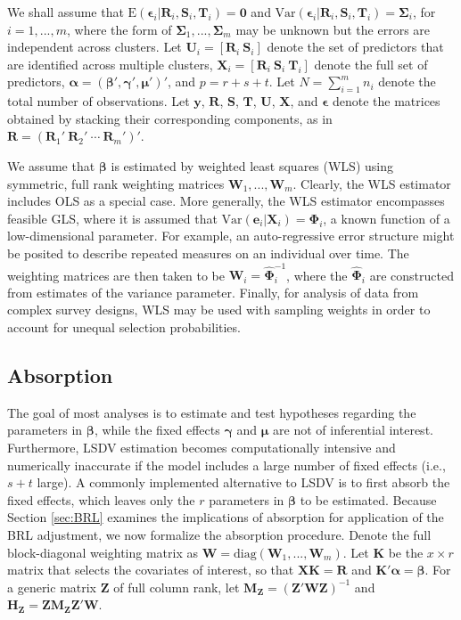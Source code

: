 \documentclass[12pt]{article}\usepackage[]{graphicx}\usepackage[]{color}
\newcommand{\E}{\text{E}}
\newcommand{\Var}{\text{Var}}
\newcommand{\bm}{\mathbf}
\newcommand{\bs}{\boldsymbol}
\begin{document}
We shall assume that $\E\left(\bs\epsilon_i\left|\bm{R}_i,\bm{S}_i, \bm{T}_i\right.\right) = \bm{0}$ and $\Var\left(\bs\epsilon_i\left|\bm{R}_i,\bm{S}_i,\bm{T}_i\right.\right) = \bs\Sigma_i$, for $i = 1,...,m$, where the form of $\bs\Sigma_1,...,\bs\Sigma_m$ may be unknown but the errors are independent across clusters. 
Let $\bm{U}_i = \left[\bm{R}_i \ \bm{S}_i \right]$ denote the set of predictors that are identified across multiple clusters, $\bm{X}_i = \left[\bm{R}_i \ \bm{S}_i \ \bm{T}_i \right]$ denote the full set of predictors, $\bs\alpha = \left(\bs\beta', \bs\gamma', \bs\mu' \right)'$, and $p = r + s + t$.
Let $N = \sum_{i=1}^m n_i$ denote the total number of observations.
Let $\bm{y}$, $\bm{R}$, $\bm{S}$, $\bm{T}$, $\bm{U}$, $\bm{X}$, and $\bs\epsilon$ denote the matrices obtained by stacking their corresponding components, as in $\bm{R} = \left(\bm{R}_1' \ \bm{R}_2' \ \cdots \ \bm{R}_m'\right)'$. 

We assume that $\bs\beta$ is estimated by weighted least squares (WLS) using symmetric, full rank weighting matrices $\bm{W}_1,...,\bm{W}_m$. 
Clearly, the WLS estimator includes OLS as a special case.
More generally, the WLS estimator encompasses feasible GLS, where it is assumed that $\Var\left(\bm{e}_i\left|\bm{X}_i\right.\right) = \bs\Phi_i$, a known function of a low-dimensional parameter. 
For example, an auto-regressive error structure might be posited to describe repeated measures on an individual over time. 
The weighting matrices are then taken to be $\bm{W}_i = \hat{\bs\Phi}_i^{-1}$, where the $\hat{\bs\Phi}_i$ are constructed from estimates of the variance parameter.
Finally, for analysis of data from complex survey designs, WLS may be used with sampling weights in order to account for unequal selection probabilities.

\subsection{Absorption}

The goal of most analyses is to estimate and test hypotheses regarding the parameters in $\bs\beta$, while the fixed effects $\bs\gamma$ and $\bs\mu$ are not of inferential interest. Furthermore, LSDV estimation becomes computationally intensive and numerically inaccurate if the model includes a large number of fixed effects (i.e., $s + t$ large). 
A commonly implemented alternative to LSDV is to first absorb the fixed effects, which leaves only the $r$ parameters in $\bs\beta$ to be estimated. 
Because Section \ref{sec:BRL} examines the implications of absorption for application of the BRL adjustment, we now formalize the absorption procedure.
Denote the full block-diagonal weighting matrix as $\bm{W} = \text{diag}\left(\bm{W}_1,...,\bm{W}_m\right)$.
Let $\bm{K}$ be the $x \times r$ matrix that selects the covariates of interest, so that $\bm{X} \bm{K} = \bm{R}$ and $\bm{K}'\bs\alpha = \bs\beta$.
For a generic matrix $\bm{Z}$ of full column rank, let $\bm{M_Z} = \left(\bm{Z}'\bm{W}\bm{Z}\right)^{-1}$ and $\bm{H_Z} = \bm{Z}\bm{M_Z}\bm{Z}'\bm{W}$. 
\end{document}
